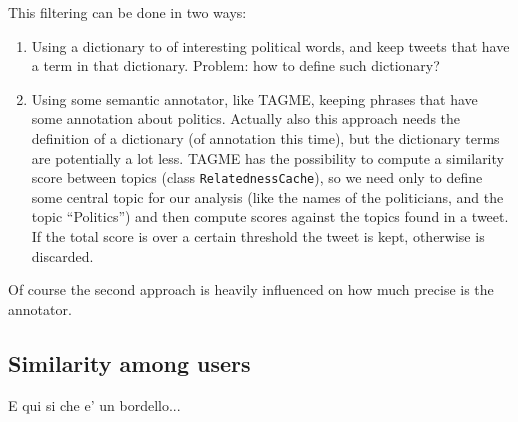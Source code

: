 \documentclass[a4paper,11pt,oneside]{article}
\begin{document}
This filtering can be done in two ways:
\begin{enumerate}
\item Using a dictionary to of interesting political words, and keep tweets that have a term in that dictionary. Problem:  how to define such dictionary?
\item Using some semantic annotator, like TAGME, keeping phrases that have some annotation about politics. Actually also this approach needs the definition of a dictionary (of annotation this time), but the dictionary terms are potentially a lot less. TAGME has the possibility to compute a similarity score between topics (class \texttt{RelatednessCache}), so we need only to define some central topic for our analysis (like the names of the politicians, and the topic ``Politics'') and then compute scores against the topics found in a tweet. If the total score is over a certain threshold the tweet is kept, otherwise is discarded.
\end{enumerate}

Of course the second approach is heavily influenced on how much precise is the annotator.

\subsection{Similarity among users}
E qui si che e' un bordello...

%
\end{document}
